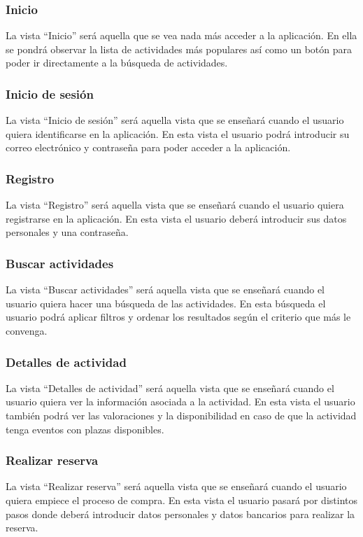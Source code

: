 \subsubsection{Inicio}
La vista “Inicio” será aquella que se vea nada más acceder a la aplicación. En ella se pondrá observar la lista de actividades más populares así como un botón para poder ir directamente a la búsqueda de actividades.

\subsubsection{Inicio de sesión}
La vista “Inicio de sesión” será aquella vista que se enseñará cuando el usuario quiera identificarse en la aplicación.
En esta vista el usuario podrá introducir su correo electrónico y contraseña para poder acceder a la aplicación.

\subsubsection{Registro}
La vista “Registro” será aquella vista que se enseñará cuando el usuario quiera registrarse en la aplicación.
En esta vista el usuario deberá introducir sus datos personales y una contraseña.

\subsubsection{Buscar actividades}
La vista “Buscar actividades” será aquella vista que se enseñará cuando el usuario quiera hacer una búsqueda de las actividades. En esta búsqueda el usuario podrá aplicar filtros y ordenar los resultados según el criterio que más le convenga.

\subsubsection{Detalles de actividad}
La vista “Detalles de actividad” será aquella vista que se enseñará cuando el usuario quiera ver la información asociada a la actividad. En esta vista el usuario también podrá ver las valoraciones y la disponibilidad en caso de que la actividad tenga eventos con plazas disponibles.

\subsubsection{Realizar reserva}
La vista “Realizar reserva” será aquella vista que se enseñará cuando el usuario quiera empiece el proceso de compra. En esta vista el usuario pasará por distintos pasos donde deberá introducir datos personales y datos bancarios para realizar la reserva.

